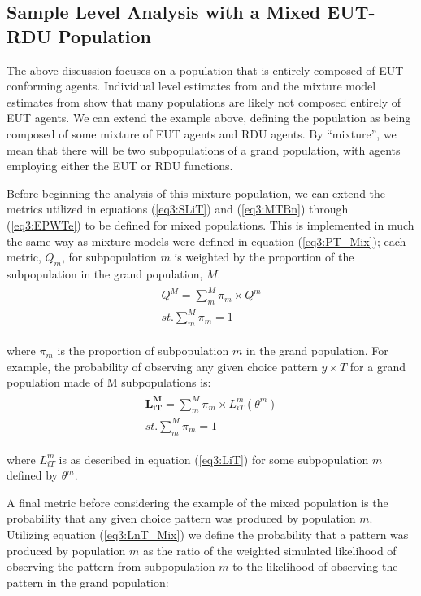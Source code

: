 \documentclass[../main.tex]{subfiles}
\begin{document}
\subsection{Sample Level Analysis with a Mixed EUT-RDU Population}

The above discussion focuses on a population that is entirely composed of EUT conforming agents.
Individual level estimates from \textcite{Hey1994} and the mixture model estimates from \textcite{Harrison2009} show that many populations are likely not composed entirely of EUT agents.
We can extend the example above, defining the population as being composed of some mixture of EUT agents and RDU agents.
By \enquote{mixture}, we mean that there will be two subpopulations of a grand population, with agents employing either the EUT or RDU functions.

Before beginning the analysis of this mixture population, we can extend the metrics utilized in equations (\ref{eq3:SLiT}) and (\ref{eq3:MTBn}) through (\ref{eq3:EPWTe}) to be defined for mixed populations.
This is implemented in much the same way as mixture models were defined in equation (\ref{eq3:PT_Mix}); each metric, $Q_m$, for subpopulation $m$ is weighted by the proportion of the subpopulation in the grand population, $M$.
\begin{align}
	\label{eq3:Metric_Mix}
	\begin{split}
		\bm{\mathit{Q^M}} = \sum_m^M \pi_m \times Q^m \\
		\mathit{st.} \sum_m^M \pi_m = 1
	\end{split}
\end{align}

\noindent where $\pi_m$ is the proportion of subpopulation $m$ in the grand population.
For example, the probability of observing any given choice pattern $y \times T$ for a grand population made of M subpopulations is:
\begin{align}
	\label{eq3:LnT_Mix}
	\begin{split}
		\bm{L_{iT}^M} = \sum_m^M \pi_m \times L_{iT}^m(\theta^m) \\
		\mathit{st.} \sum_m^M \pi_m = 1
	\end{split}
\end{align}

\noindent where $L_{iT}^m$ is as described in equation (\ref{eq3:LiT}) for some subpopulation $m$ defined by $\theta^m$.

A final metric before considering the example of the mixed population is the probability that any given choice pattern was produced by population $m$.
Utilizing equation (\ref{eq3:LnT_Mix}) we define the probability that a pattern was produced by population $m$ as the ratio of the weighted simulated likelihood of observing the pattern from subpopulation $m$ to the likelihood of observing the pattern in the grand population:
\end{document}

